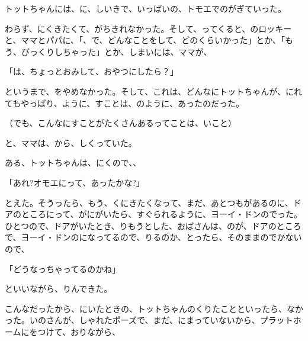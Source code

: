 トットちゃんには、に、しいきで、いっぱいの、トモエでのがぎていった。

わらず、にくきたくて、がちきれなかった。そして、ってくると、のロッキーと、ママとパパに、「、で、どんなことをして、どのくらいかった」とか、「もう、びっくりしちゃった」とか、しまいには、ママが、

「は、ちょっとおみして、おやつにしたら？」

というまで、をやめなかった。そして、これは、どんなにトットちゃんが、にれてもやっぱり、ように、すことは、のように、あったのだった。

（でも、こんなにすことがたくさんあるってことは、いこと）

と、ママは、から、しくっていた。

ある、トットちゃんは、にくので、、

「あれ?オモエにって、あったかな?」

とえた。そうったら、もう、くにきたくなって、まだ、あとつもがあるのに、ドアのところにって、がにがいたら、すぐられるように、ヨーイ・ドンのでった。ひとつので、ドアがいたとき、りもうとした、おばさんは、のが、ドアのところで、ヨーイ・ドンのになってるので、りるのか、とったら、そのままのでかないので、

「どうなっちゃってるのかね」

といいながら、りんできた。

こんなだったから、にいたときの、トットちゃんのくりたことといったら、なかった。いのさんが、しゃれたポーズで、まだ、にまっていないから、プラットホームにをつけて、おりながら、

